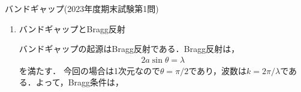 \documentclass{report}
\begin{document}
\begin{myex}{バンドギャップ(2023年度期末試験第1問)}{}
\begin{enumerate}
        と定義する．
        簡単な計算により，$V_{k_+k_+} = V_{k_-k_-} = 0$，$V_{k_+k_-} = V_{k_-k_+} = V$である．
        より，1次摂動によるエネルギーは，
        \begin{align}
          E_n^{(1)} &= \frac{1}{2}\qty[\qty(V_{k_+k_+} + V_{k_-k_-})\pm\sqrt{(V_{k_+k_+} - V_{k_-k_-})^2 + 4\abs{V_{k_+k_-}}^2}] \\ 
          &= \pm V
        \end{align}
        である．2つのエネルギー補正の差がバンドギャップエネルギー$\Delta E$と解釈できるので，
        \begin{align}
          \Delta E = 2V
        \end{align}
        を得る．\par
        の$\alpha$と$\beta$はの解であるから，$\sqrt{\alpha^2 + \beta^2} = 1$なる規格化条件を課すと，
        \begin{align}
          \mqty(\alpha \\ \beta) = 
          \begin{dcases}
            \frac{1}{\sqrt{2}}\mqty(1 \\ 1) & E_n^{(1)} = V \\ 
            \frac{1}{\sqrt{2}}\mqty(1 \\ -1) & E_n^{(1)} = -V
          \end{dcases}
        \end{align}
        となる．よって，
        $\Delta E = \pm V$に対応する波動関数はBrillouinゾーン端で，
        \begin{align}
          \psi_{+}& = \frac{1}{\sqrt{2}}\qty(\phi_{\pi/a} + \phi_{-\pi/a})\propto\cos\qty(\frac{\pi}{a}x)\label{degeneracy-wave-function-positive}\\
          \psi_{-}& = \frac{1}{\sqrt{2}}\qty(\phi_{\pi/a} - \phi_{-\pi/a})\propto\sin\qty(\frac{\pi}{a}x)\label{degeneracy-wave-function-negative}
        \end{align}
        であり，定在波が生じる．
      \item バンドギャップとBragg反射\par
        バンドギャップの起源はBragg反射である．Bragg反射は，
        \begin{align}
          2a\sin\theta = \lambda
        \end{align}
        を満たす．
        今回の場合は1次元なので$\theta = \pi/2$であり，波数は$k = 2\pi/\lambda$である．よって，Bragg条件は，
        \begin{align}

\end{align}
\end{enumerate}
\end{myex}
\end{document}
